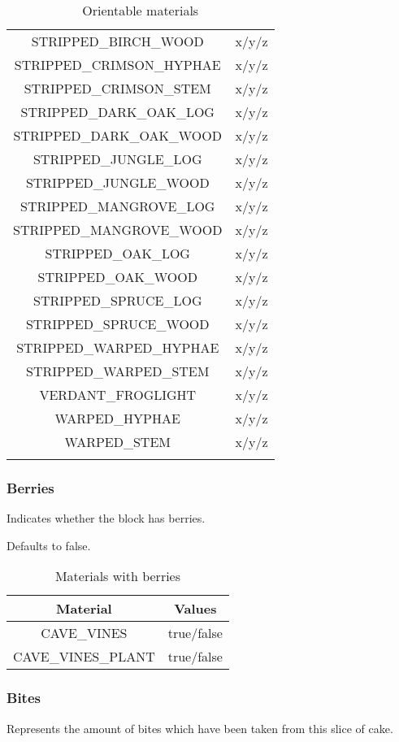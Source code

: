 \begin{longtable}{ |c|c| }
	STRIPPED\_BIRCH\_WOOD & x/y/z \\
	STRIPPED\_CRIMSON\_HYPHAE & x/y/z \\
	STRIPPED\_CRIMSON\_STEM & x/y/z \\
	STRIPPED\_DARK\_OAK\_LOG & x/y/z \\
	STRIPPED\_DARK\_OAK\_WOOD & x/y/z \\
	STRIPPED\_JUNGLE\_LOG & x/y/z \\
	STRIPPED\_JUNGLE\_WOOD & x/y/z \\
	STRIPPED\_MANGROVE\_LOG & x/y/z \\
	STRIPPED\_MANGROVE\_WOOD & x/y/z \\
	STRIPPED\_OAK\_LOG & x/y/z \\
	STRIPPED\_OAK\_WOOD & x/y/z \\
	STRIPPED\_SPRUCE\_LOG & x/y/z \\
	STRIPPED\_SPRUCE\_WOOD & x/y/z \\
	STRIPPED\_WARPED\_HYPHAE & x/y/z \\
	STRIPPED\_WARPED\_STEM & x/y/z \\
	VERDANT\_FROGLIGHT & x/y/z \\
	WARPED\_HYPHAE & x/y/z \\
	WARPED\_STEM & x/y/z \\
	\hline
	\caption{Orientable materials}
\end{longtable}

\subsubsection{Berries}
Indicates whether the block has berries.

Defaults to false.

\begin{table}[H]
	\centering
	\begin{tabular}{ |c|c| }
		\hline
		Material & Values \\
		\hline
		CAVE\_VINES & true/false \\
		CAVE\_VINES\_PLANT & true/false \\
		\hline
	\end{tabular}
	\caption{Materials with berries}
\end{table}

\subsubsection{Bites}
Represents the amount of bites which have been taken from this slice of cake.

